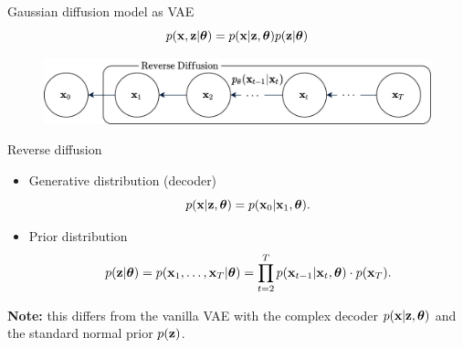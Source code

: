 \begin{frame}{Gaussian diffusion model as VAE}
	\vspace{-0.3cm}
	\[
		p(\mathbf{x}, \mathbf{z} | \boldsymbol{\theta}) = p(\mathbf{x} | \mathbf{z}, \boldsymbol{\theta}) p(\mathbf{z} | \boldsymbol{\theta})
	\]	
	\vspace{-0.3cm}
	\begin{figure}
		\includegraphics[width=0.8\linewidth]{figs/diffusion_pgm_reverse}
	\end{figure}
	\vspace{-0.2cm}
	\begin{block}{Reverse diffusion}
		\begin{itemize}
			\item Generative distribution (decoder)
			\[
				p(\mathbf{x} | \mathbf{z}, \boldsymbol{\theta}) = p(\mathbf{x}_0 | \mathbf{x}_1, \boldsymbol{\theta}).
			\]
			\item Prior distribution
			\vspace{-0.3cm}
			\[
				p(\mathbf{z} | \boldsymbol{\theta}) = p(\mathbf{x}_1, \dots, \mathbf{x}_T | \boldsymbol{\theta}) = \prod_{t=2}^T p(\mathbf{x}_{t - 1} | \mathbf{x}_t, \boldsymbol{\theta})  \cdot p(\mathbf{x}_T).
			\]
		\end{itemize}
		\textbf{Note:} this differs from the vanilla VAE with the complex decoder $p(\mathbf{x} | \mathbf{z}, \boldsymbol{\theta})$ and the standard normal prior $p(\mathbf{z})$.
	\end{block}
\end{frame}
